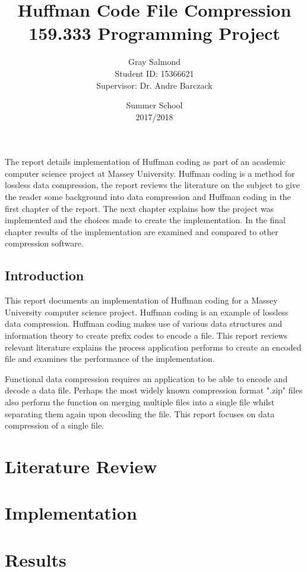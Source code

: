 \documentclass{report}
\title{Huffman Code File Compression\\159.333 Programming Project}
\date{Summer School\\2017/2018}
\author{Gray Salmond\\ Student ID: 15366621\\
Supervisor: Dr. Andre Barczack}
\begin{document}
\maketitle    
{}    
\newpage

\abstract
\singlespacing
The report details implementation of Huffman coding as part of an academic computer science project at Massey University. Huffman coding is a method for lossless data compression, the report reviews the literature on the subject to give the reader some background into data compression and Huffman coding in the first chapter of the report. The next chapter explains how the project was implemented and the choices made to create the implementation. In the final chapter results of the implementation are examined and compared to other compression software.
\newpage



\tableofcontents
\newpage


\listoffigures

\listoftables

\newpage
\doublespacing
\section*{Introduction}


\singlespacing
This report documents an implementation of Huffman coding for a Massey University computer science project. Huffman coding is an example of lossless data compression. Huffman coding makes use of various data structures and information theory to create prefix codes to encode a file. This report reviews relevant literature explains the process application performs to create an encoded file and examines the performance of the implementation.


\doublespacing
\singlespacing
Functional data compression requires an application to be able to encode and decode a data file. Perhaps the most widely known compression format ".zip" files also perform the function on merging multiple files into a single file whilst separating them again upon decoding the file. This report focuses on data compression of a single file.

\chapter{Literature Review}



\chapter{Implementation}



\chapter{Results}





 

\end{document}

